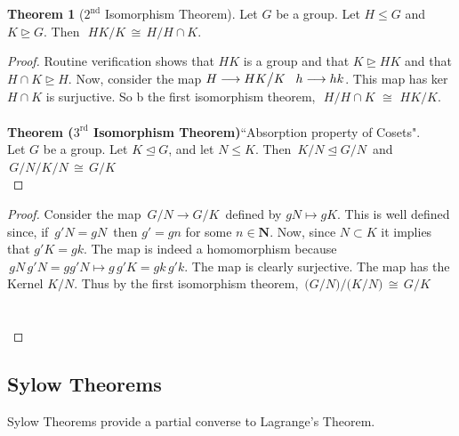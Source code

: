 \documentclass[11pt,a4paper]{article}
\theoremstyle{definition}
\newtheorem{thm}{Theorem}[subsection]
\begin{document}
\begin{thm}[$2^{\text{nd}}$ Isomorphism Theorem]
Let $G$ be a group. Let $H\leq G$ and $K\trianglerighteq G$. Then $\, \, H K\big/ K\, \cong\, H\big/ H\cap K$.\\
\end{thm}


\begin{proof}
Routine verification shows that $HK$ is a group and that $K\trianglerighteq HK$ and that $H\cap K\trianglerighteq H$. Now, consider the map $H\longrightarrow HK\big/ K\hspace{0.3cm} h\longrightarrow hk$. This map has ker$H\cap K$ is surjuctive. So b the first isomorphism theorem, $\, \, H\big/H\cap K\, \, \cong \, \, HK\big/K$.\\\\






\textbf{Theorem ($3^{\text{rd}}$ Isomorphism Theorem)}``Absorption property of Cosets".\\
Let $G$ be a group. Let $K \trianglelefteq G$, and let $N\leq K$. Then $\, K\big/N\trianglelefteq G\big/N\,$ and $\, G/N\Big/K/N\, \cong\, G\big/K$\\
\end{proof}


\begin{proof}
Consider the map $\, G\big/N\longrightarrow G\big/K\,$ defined by $gN\longmapsto g K$. This is well defined since, if $\, g'N = g N\,$ then $g' = gn$ for some $n\in \textbf{N}$. Now, since $N\subset K$ it implies that $g'K = gk$. The map is indeed a homomorphism because $\, gN\, g'N = g g'N \longmapsto g\, g' K = gk\, g'k$. The map is clearly surjective. The map has the Kernel $K/N$. Thus by the first isomorphism theorem, $\, \big(G/N\big)\Big/\big(K/N\big)\, \cong \, G\big/ K$\\\\\\
\end{proof}












\subsection{Sylow Theorems}
Sylow Theorems provide a partial converse to Lagrange's Theorem.\\\\
\end{document}

